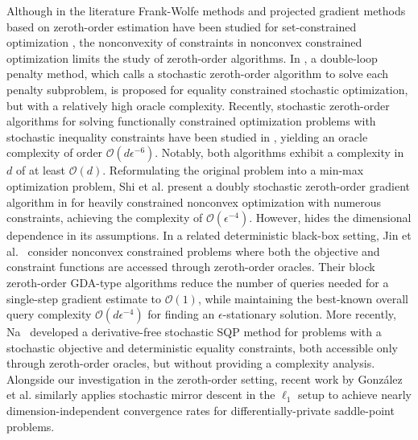 \documentclass[11pt]{article}
\numberwithin{equation}{section}
\def\blue#1{\textcolor{blue}{#1}}
\begin{document}
Although in the literature Frank-Wolfe methods and projected gradient methods based on zeroth-order estimation have been studied for set-constrained optimization \cite{BGNips18, BG22}, the nonconvexity of constraints in  nonconvex constrained optimization limits the study of zeroth-order algorithms. In \cite{wang2017penalty}, a double-loop penalty method, which calls a stochastic zeroth-order algorithm to solve each penalty subproblem, is proposed for equality constrained stochastic optimization, but with a relatively high oracle complexity.  
Recently, stochastic zeroth-order algorithms for solving functionally constrained optimization problems with stochastic inequality constraints have been studied in \cite{nguyen2022stochastic}, yielding an oracle complexity of order \(\mathcal{O}(d\epsilon^{-6})\).
Notably, both algorithms exhibit a complexity in $d$ of at least \(\mathcal{O}(d)\). 
Reformulating the original problem into a min-max optimization problem, Shi et al. present a doubly stochastic zeroth-order gradient algorithm in \cite{SGG} for heavily constrained nonconvex optimization with numerous constraints, achieving the complexity of \(\mathcal{O}(\epsilon^{-4})\). 
However, \cite{SGG} hides the dimensional dependence in its assumptions. In a related deterministic black-box setting, Jin et al.~\cite{jin2026query} consider nonconvex constrained problems where both the objective and constraint functions are accessed through zeroth-order oracles. Their block zeroth-order GDA-type algorithms reduce the number of queries needed for a single-step gradient estimate to \(\mathcal{O}(1)\), while maintaining the best-known overall query complexity \(\mathcal{O}(d\epsilon^{-4})\) for finding an \(\epsilon\)-stationary solution. More recently, Na~\cite{na2025derivative} developed a derivative-free
stochastic SQP method for problems with a stochastic objective and
deterministic equality constraints, both accessible only through
zeroth-order oracles, but without providing a complexity analysis. Alongside our investigation in the zeroth-order setting, recent work by Gonz\'{a}lez et al. \cite{gonzalez2026mirror} similarly applies stochastic mirror descent in the $\ell_1$ setup to achieve nearly dimension-independent convergence rates for differentially-private saddle-point problems. 
\end{document}
